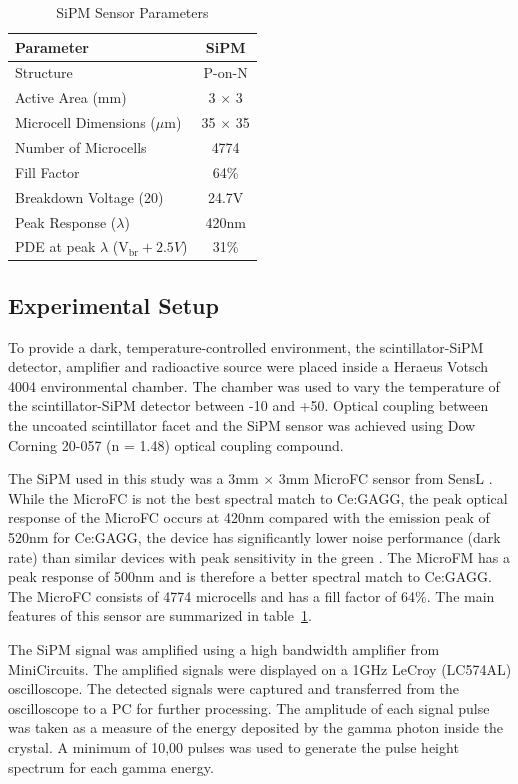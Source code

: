 \documentclass[journal]{IEEEtran}
\begin{document}
\begin{table}[t] %
\renewcommand{\arraystretch}{1.2}
\caption{SiPM Sensor Parameters}
\label{tab:spm_param}
\centering
\begin{tabular}{l | c }
\hline
\bfseries Parameter &  \bfseries SiPM\\
\hline \hline
Structure & P-on-N\\
Active Area (mm) & 3 $\times$ 3\\
Microcell Dimensions ($\mu$m) & 35 $\times$ 35\\
Number of Microcells & 4774\\
Fill Factor & 64\%\\
Breakdown Voltage (20\celsius{}) & 24.7V\\
Peak Response ($\lambda$) & 420nm\\ 
PDE at peak $\lambda$ (V$_{\text{br}}+2.5V$) & 31\%\\
\hline
\end{tabular}
\end{table}

%
\subsection{Experimental Setup}

To provide a dark, temperature-controlled environment, the scintillator-SiPM detector, amplifier and radioactive source were placed inside a Heraeus Votsch 4004 environmental chamber. The chamber was used to vary the temperature of the scintillator-SiPM detector between -10 and +50\celsius{}. Optical coupling between the uncoated scintillator facet and the SiPM sensor was achieved using Dow Corning 20-057 (n = 1.48) optical coupling compound. 

The SiPM used in this study was a 3mm $\times$ 3mm MicroFC sensor from SensL \cite{sensl:oneill2}. While the MicroFC is not the best spectral match to Ce:GAGG, the peak optical response of the MicroFC occurs at 420nm compared with the emission peak of 520nm for Ce:GAGG, the device has significantly lower noise performance (dark rate) than similar devices with peak sensitivity in the green \cite{stewart:microFC}. The MicroFM has a peak response of 500nm and is therefore a better spectral match to Ce:GAGG. The MicroFC consists of 4774 microcells and has a fill factor of 64\%. The main features of this sensor are summarized in table~\ref{tab:spm_param}.  

The SiPM signal was amplified using a high bandwidth amplifier from MiniCircuits. The amplified signals were displayed on a 1GHz LeCroy (LC574AL) oscilloscope. The detected signals were captured and transferred from the oscilloscope to a PC for further processing. The amplitude of each signal pulse was taken as a measure of the energy deposited by the gamma photon inside the crystal. A minimum of 10,00 pulses was used to generate the pulse height spectrum for each gamma energy.  
\end{document}
